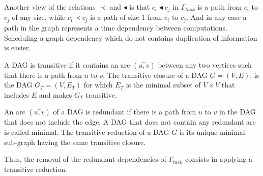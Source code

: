 Another view of the relations $\prec$ and $\blacktriangleleft$ is that $c_i\blacktriangleleft c_j$ in $\Gamma_{task}$ is a path from $c_i$ to $c_j$ of any size, while $c_i \prec c_j$ is a path of size $1$ from $c_i$ to $c_j$. And in any case a path in the graph represents a time dependency between computations. Scheduling a graph dependency which do not contains duplication of information is easier. 

\begin{mydef}
A DAG is transitive if it contains an arc $(\overset{\frown}{u,v})$ between any two vertices such that there is a path from $u$ to $v$. The transitive closure of a DAG $G=(V,E)$, is the DAG $G_T=(V,E_T)$ for which $E_T$ is the minimal subset of $V \times V$ that includes $E$ and makes $G_T$ transitive.
\end{mydef}

\begin{mydef}
An arc $(\overset{\frown}{u,v})$ of a DAG is redundant if there is a path from $u$ to $v$ in the DAG that does not include the edge. A DAG that does not contain any redundant arc is called minimal. The transitive reduction of a DAG $G$ is its unique minimal sub-graph having the same transitive closure.
\end{mydef}

Thus, the removal of the redundant dependencies of $\Gamma_{task}$ consists in applying a transitive reduction.

